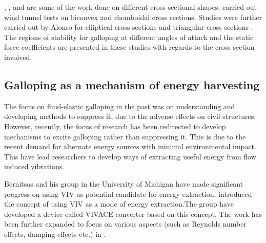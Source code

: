  
  
  
\citet{Naudascher1993}, \citet{Ruscheweyh1996}, \citet{Deniz1997} and \citet{Weaver2005} are some of the work done on different cross sectional shapes. \citet{Alonso2009} carried out wind tunnel tests on biconvex and rhomboidal cross sections. Studies were further carried out by Alonso for elliptical cross sections \citep{Alonso2010} and triangular cross sections \citep{Alonso2005}. The regions of stability for galloping at different angles of attack and the static force coefficients are presented in these studies with regards to the cross section involved. 


\subsection{Galloping as a mechanism of energy harvesting}

The focus on fluid-elastic galloping in the past was on understanding and developing methods to suppress it, due to the adverse effects on civil structures. However, recently, the focus of research has been redirected to develop mechanisms to excite galloping rather than suppressing it. This is due to the recent demand for alternate energy sources with minimal environmental impact. This have lead researchers to develop ways of extracting useful energy from flow induced vibrations.

Bernitsas and his group in the University of Michigan have made significant progress on using VIV as potential candidate for energy extraction. \cite{Bernitsas2008a-concept} introduced the concept of using VIV as a mode of energy extraction.The group have developed a device called VIVACE converter based on this concept. The work has been further expanded to focus on various aspects (such as Reynolds number effects, damping effects etc.) in \citet{Bernitsas2009,Raghavan2009,Raghavan2010a,Lee2011a}.












  


 
 

 
 
 
 

 
 
 
 
 
 
 
 























  


    

     










